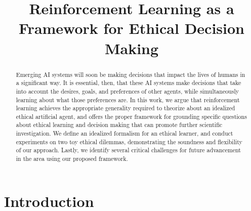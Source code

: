 \documentclass[11pt]{article}
\title{Reinforcement Learning as a Framework for Ethical Decision Making}
\author{}
\date{}                                           %
\begin{document}
\maketitle


\begin{abstract}
Emerging AI systems will soon be making decisions that impact the lives of humans in a significant way. It is essential, then, that these AI systems make decisions that take into account the desires, goals, and preferences of other agents, while simultaneously learning about what those preferences are.
In this work, we argue that reinforcement learning achieves the appropriate generality required to theorize about an idealized ethical artificial agent, and offers the proper framework for grounding specific questions about ethical learning and decision making that can promote further scientific investigation. We define an idealized formalism for an ethical learner, and conduct experiments on two toy ethical dilemmas, demonstrating the soundness and flexibility of our approach.
Lastly, we identify several critical challenges for future advancement in the area using our proposed framework.

\end{abstract}

\section{Introduction}
\end{document}
